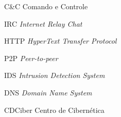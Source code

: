 \begin{siglas}
	\item[C\&C] Comando e Controle
	\item[IRC] \textit{Internet Relay Chat}
	\item[HTTP] \textit{HyperText Transfer Protocol}
	\item[P2P] \textit{Peer-to-peer}
	\item[IDS] \textit{Intrusion Detection System}
	\item[DNS] \textit{Domain Name System}
	\item[CDCiber] Centro de Cibernética
\end{siglas}